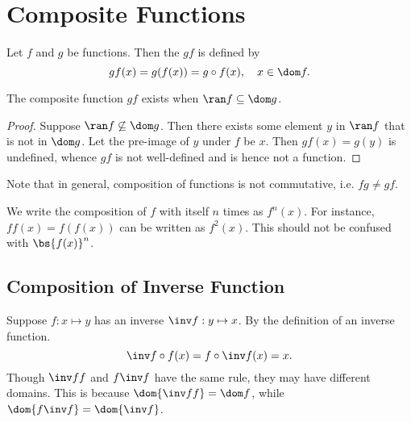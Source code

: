 \section{Composite Functions}

\begin{definition}
    Let $f$ and $g$ be functions. Then the  $gf$ is defined by \[gf(x) = g(f(x)) = g \circ f(x), \quad x \in \dom f.\]
\end{definition}

\begin{proposition}
    The composite function $gf$ exists when $\ran f \subseteq \dom g$.
\end{proposition}
\begin{proof}
    Suppose $\ran f \not\subseteq \dom g$. Then there exists some element $y$ in $\ran f$ that is not in $\dom g$. Let the pre-image of $y$ under $f$ be $x$. Then $gf(x) = g(y)$ is undefined, whence $gf$ is not well-defined and is hence not a function.
\end{proof}

Note that in general, composition of functions is not commutative, i.e. $fg \neq gf$.

We write the composition of $f$ with itself $n$ times as $f^n(x)$. For instance, $ff(x) = f(f(x))$ can be written as $f^2(x)$. This should not be confused with $\bs{f(x)}^n$.

\subsection{Composition of Inverse Function}

Suppose $f : x \mapsto y$ has an inverse $\inv f : y \mapsto x$. By the definition of an inverse function. \[\inv f \circ f(x) = f \circ \inv f(x) = x.\] Though $\inv f f$ and $f \inv f$ have the same rule, they may have different domains. This is because $\dom {\inv f f} = \dom f$, while $\dom {f \inv f} = \dom {\inv f}$.
